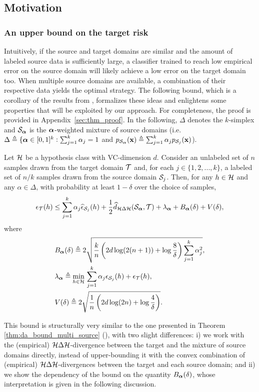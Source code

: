 \subsection{Motivation}

\subsubsection{An upper bound on the target risk}

Intuitively, if the source and target domains are similar and the amount of labeled source data is sufficiently large, a classifier trained to reach low empirical error on the source domain will likely achieve a low error on the target domain too. When multiple source domains are available, a combination of their respective data yields the optimal strategy. The following bound, which is a corollary of the results from \citet{BenDavid2010}, formalizes these ideas and enlightens some properties that will be exploited by our approach. For completeness, the proof is provided in Appendix~\ref{sec:thm_proof}. In the following, $\Delta$ denotes the $k$-simplex and ${\mathcal{S}}_{{\bm{\alpha}}}$ is the ${\bm{\alpha}}$-weighted mixture of source domains (i.e.\ $\Delta \triangleq \lbrace {\bm{\alpha}} \in [0,1]^k: \sum_{j=1}^{k} \alpha_j = 1$ and  $p_{{\mathcal{S}}_{{\bm{\alpha}}}}({\mathbf{x}}) \triangleq \sum_{j=1}^{k} {\alpha}_j p_{{\mathcal{S}}_j}({\mathbf{x}})$).

\begin{theorem}
	\label{thm:target_risk_bound}
	Let ${\mathcal{H}}$ be a hypothesis class with VC-dimension $d$. Consider an unlabeled set of $n$ samples drawn from the target domain ${\mathcal{T}}$ and, for each $j \in \{1,2,...,k\}$, a labeled set of $n/k$ samples drawn from the source domain ${\mathcal{S}}_j$. Then, for any $h \in {\mathcal{H}}$ and any $\alpha \in \Delta$, with probability at least $1-\delta$ over the choice of samples,
	\begin{equation}
	\label{eq:bound}
	\epsilon_{\mathcal{T}}(h) \leq \sum_{j=1}^k \alpha_j \widehat{\epsilon}_{{\mathcal{S}}_j}(h) + \frac{1}{2} \widehat{d}_{{\mathcal{H}} \Delta {\mathcal{H}}}({\mathcal{S}}_{\bm{\alpha}}, {\mathcal{T}}) + \lambda_{\bm{\alpha}} + B_{\bm{\alpha}}(\delta) + V(\delta),
	\end{equation}
	where
	\begin{align}
	&B_{\bm{\alpha}}(\delta) \triangleq 2\sqrt{\frac{k}{n}\left(2d \log(2(n+1)) + \log\frac{8}{\delta}\right)\sum_{j=1}^k {\alpha}_j^2}, \\
	&\lambda_{\bm{\alpha}} \triangleq \min_{h \in {\mathcal{H}}}\, \sum_{j=1}^k {\alpha}_j \epsilon_{{\mathcal{S}}_j}(h) + \epsilon_{{\mathcal{T}}}(h), \\
	&V(\delta) \triangleq 2 \sqrt{\frac{1}{n} \left( 2d\log(2n) + \log\frac{4}{\delta} \right)}.
	\end{align}
\end{theorem}
This bound is structurally very similar to the one presented in Theorem \ref{thm:da_bound_multi_source} (\citet{Zhao2018}), with two slight differences: i) we work with the (empirical) ${\mathcal{H}} \Delta {\mathcal{H}}$-divergence between the target and the mixture of source domains directly, instead of upper-bounding it with the convex combination of (empirical) ${\mathcal{H}} \Delta {\mathcal{H}}$-divergences between the target and each source domain; and ii) we show the dependency of the bound on the quantity $B_{\bm{\alpha}}(\delta)$, whose interpretation is given in the following discussion.

